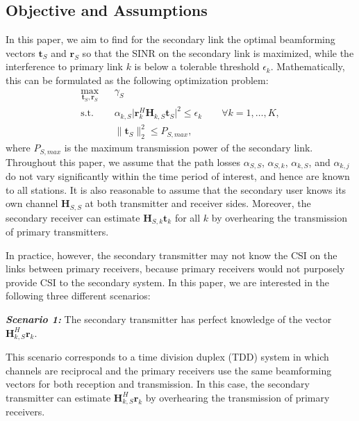 \documentclass[twocolumn,10pt]{IEEEtran}
\theoremstyle{plain} \newtheorem{theorem}{Theorem}
\theoremstyle{plain} \newtheorem{proposition}{Proposition}
\theoremstyle{plain} \newtheorem{corollary}{Corollary}
\theoremstyle{remark} \newtheorem{remark}{Remark}
\theoremstyle{remark} \newtheorem{lemma}{Lemma}
\theoremstyle{plain} \newtheorem{definition}{Definition}
\theoremstyle{plain} \newtheorem{assumption}{Assumption}
\theoremstyle{plain} \newtheorem{fact}{Fact}
\begin{document}
\subsection{Objective and Assumptions}

In this paper, we aim to find for the secondary link the optimal beamforming vectors $\mathbf{t}_S$ and $\mathbf{r}_S$ so that the SINR on the secondary link is maximized, while the interference to primary link $k$ is below a tolerable threshold $\epsilon_k$. Mathematically, this can be formulated as the following optimization problem:
\begin{subequations}\label{eqn:generalform}
\begin{eqnarray}
\max_{\mathbf{t}_S, \mathbf{r}_S}&& \gamma_S \\
\text{s.t. }&&\alpha_{k,S}\big| \mathbf{r}_k^H \mathbf{H}_{k,S}\mathbf{t}_S\big|^2 \leq \epsilon_k \qquad\forall k=1,\ldots,K, \label{constraint:10b}\\
&&\|\mathbf{t}_S\|_2^2\leq P_{S,max},
\end{eqnarray}
\end{subequations}
where $P_{S,max}$ is the maximum transmission power of the secondary link.
Throughout this paper, we assume that the path losses $\alpha_{S,S}$, $\alpha_{S,k}$, $\alpha_{k,S}$, and $\alpha_{k,j}$ do not vary significantly within the time period of interest, and hence are known to all stations. It is also reasonable to assume that the secondary user knows its own channel $\mathbf{H}_{S,S}$ at both transmitter and receiver sides. Moreover, the secondary receiver can estimate $\mathbf{H}_{S,k}\mathbf{t}_k$ for all $k$ by overhearing the transmission of primary transmitters.

In practice, however, the secondary transmitter may not know the CSI on the links between primary receivers, because primary receivers would not purposely provide CSI to the secondary system. In this paper, we are interested in the following three different scenarios:

\noindent \emph{\textbf{Scenario 1:}} The secondary transmitter has perfect knowledge of the vector $\mathbf{H}_{k,S}^H\mathbf{r}_k$.

This scenario corresponds to a time division duplex (TDD) system in which channels are reciprocal and the primary receivers use the same beamforming vectors for both reception and transmission. In this case, the secondary transmitter can estimate $\mathbf{H}_{k,S}^H \mathbf{r}_k$ by overhearing the transmission of primary receivers.
\end{document}
